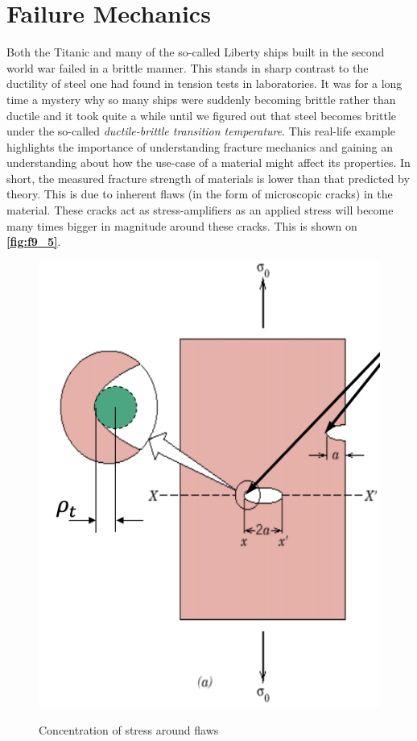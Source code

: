 \section{Failure Mechanics}
Both the Titanic and many of the so-called Liberty ships built in the second world war failed in a brittle manner. This stands in sharp contrast to the ductility of steel one had found in tension tests in laboratories. It was for a long time a mystery why so many ships were suddenly becoming brittle rather than ductile and it took quite a while until we figured out that steel becomes brittle under the so-called \textit{ductile-brittle transition temperature}. This real-life example highlights the importance of understanding fracture mechanics and gaining an understanding about how the use-case of a material might affect its properties. In short, the measured fracture strength of materials is lower than that predicted by theory. This is due to inherent flaws (in the form of microscopic cracks) in the material. These cracks act as stress-amplifiers as an applied stress will become many times bigger in magnitude around these cracks. This is shown on \textbf{\autoref{fig:f9_5}}.

\begin{figure} [ht]
  \centering
  \caption{Concentration of stress around flaws}
  \includegraphics[width=0.25\linewidth]{./figures/f9_5.png}
  \label{fig:f9_5}
\end{figure}

